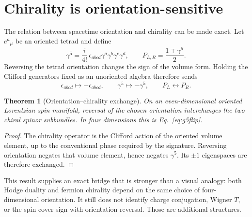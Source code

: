 \documentclass[11pt]{article}
\newtheorem{theorem}{Theorem}[section]
\theoremstyle{definition}\newtheorem{definition}[theorem]{Definition}
\theoremstyle{remark}\newtheorem{remark}[theorem]{Remark}\newtheorem{conjecture}[theorem]{Conjecture}
\begin{document}
\section{Chirality is orientation-sensitive}
The relation between spacetime orientation and chirality can be made exact. Let $e^a{}_{\mu}$ be an oriented tetrad and define
\begin{equation}
 \gamma^5=\frac{i}{4!}\,\epsilon_{abcd}\gamma^a\gamma^b\gamma^c\gamma^d,
 \qquad P_{L,R}=\frac{1\mp\gamma^5}{2}.
\end{equation}
Reversing the tetrad orientation changes the sign of the volume form. Holding the Clifford generators fixed as an unoriented algebra therefore sends
\begin{equation}\label{eq:g5flip}
 \epsilon_{abcd}\mapsto-\epsilon_{abcd},\qquad
 \gamma^5\mapsto-\gamma^5,
 \qquad P_L\leftrightarrow P_R.
\end{equation}

\begin{theorem}[Orientation--chirality exchange]\label{thm:chiralityorientation}
On an even-dimensional oriented Lorentzian spin manifold, reversal of the chosen orientation interchanges the two chiral spinor subbundles. In four dimensions this is Eq.~\eqref{eq:g5flip}.
\end{theorem}
\begin{proof}
The chirality operator is the Clifford action of the oriented volume element, up to the conventional phase required by the signature. Reversing orientation negates that volume element, hence negates $\gamma^5$. Its $\pm1$ eigenspaces are therefore exchanged.
\end{proof}

This result supplies an exact bridge that is stronger than a visual analogy: both Hodge duality and fermion chirality depend on the same choice of four-dimensional orientation. It still does not identify charge conjugation, Wigner $T$, or the spin-cover sign with orientation reversal. Those are additional structures.
\end{document}
